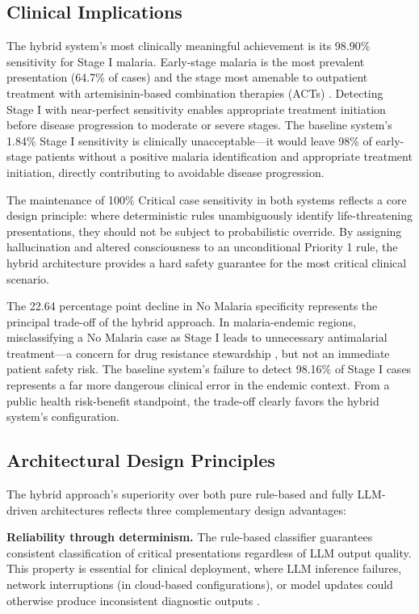 \documentclass[12pt,a4paper]{article}
\begin{document}
\subsection{Clinical Implications}

The hybrid system's most clinically meaningful achievement is its 98.90\% sensitivity for Stage I malaria. Early-stage malaria is the most prevalent presentation (64.7\% of cases) and the stage most amenable to outpatient treatment with artemisinin-based combination therapies (ACTs) \cite{ref23}. Detecting Stage I with near-perfect sensitivity enables appropriate treatment initiation before disease progression to moderate or severe stages. The baseline system's 1.84\% Stage I sensitivity is clinically unacceptable---it would leave 98\% of early-stage patients without a positive malaria identification and appropriate treatment initiation, directly contributing to avoidable disease progression.

The maintenance of 100\% Critical case sensitivity in both systems reflects a core design principle: where deterministic rules unambiguously identify life-threatening presentations, they should not be subject to probabilistic override. By assigning hallucination and altered consciousness to an unconditional Priority 1 rule, the hybrid architecture provides a hard safety guarantee for the most critical clinical scenario.

The 22.64 percentage point decline in No Malaria specificity represents the principal trade-off of the hybrid approach. In malaria-endemic regions, misclassifying a No Malaria case as Stage I leads to unnecessary antimalarial treatment---a concern for drug resistance stewardship \cite{ref23}, but not an immediate patient safety risk. The baseline system's failure to detect 98.16\% of Stage I cases represents a far more dangerous clinical error in the endemic context. From a public health risk-benefit standpoint, the trade-off clearly favors the hybrid system's configuration.

\subsection{Architectural Design Principles}

The hybrid approach's superiority over both pure rule-based and fully LLM-driven architectures reflects three complementary design advantages:

\textbf{Reliability through determinism.} The rule-based classifier guarantees consistent classification of critical presentations regardless of LLM output quality. This property is essential for clinical deployment, where LLM inference failures, network interruptions (in cloud-based configurations), or model updates could otherwise produce inconsistent diagnostic outputs \cite{ref7}.
\end{document}
